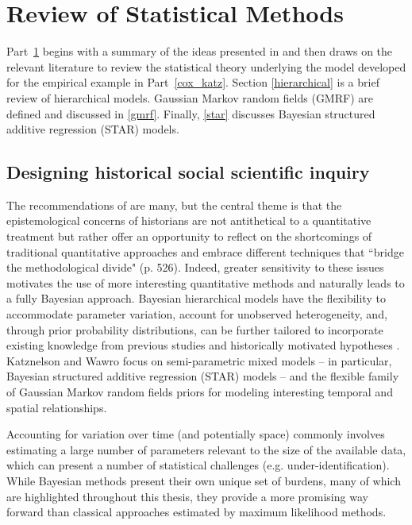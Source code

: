 
\chapter{Review of Statistical Methods}
\label{lit_review}

Part~\ref{lit_review} begins with a summary of the ideas presented in  and then draws on the relevant literature to review the statistical theory underlying the model developed for the empirical example in Part~\ref{cox_katz}. Section \ref{hierarchical} is a brief review of hierarchical models. Gaussian Markov random fields (GMRF) are defined and discussed in \ref{gmrf}. Finally, \ref{star} discusses Bayesian structured additive regression (STAR) models. 

\section{Designing historical social scientific inquiry}
\label{wawro}

The recommendations of  are many, but the central theme is that the epistemological concerns of historians are not antithetical to a quantitative treatment but rather offer an opportunity to reflect on the shortcomings of traditional quantitative approaches and embrace different techniques that ``bridge the methodological divide" (p. 526). Indeed, greater sensitivity to these issues motivates the use of more interesting quantitative methods and naturally leads to a fully Bayesian approach.   Bayesian hierarchical models have the flexibility to accommodate parameter variation, account for unobserved heterogeneity, and, through prior probability distributions, can be further tailored to incorporate existing knowledge from previous studies and historically motivated hypotheses  \cite{wawro_designing_2014, goodrich_designing_2012}. Katznelson and Wawro focus on semi-parametric mixed models -- in particular,  Bayesian structured additive regression (STAR) models -- and the flexible family of Gaussian Markov random fields priors for modeling interesting temporal and spatial relationships.

Accounting for variation over time (and potentially space) commonly involves estimating a large number of parameters relevant to the size of the available data, which can present a number of statistical challenges (e.g. under-identification). While Bayesian methods present their own unique set of burdens, many of which are highlighted throughout this thesis, they provide a more promising way forward than classical approaches estimated by maximum likelihood methods. 


